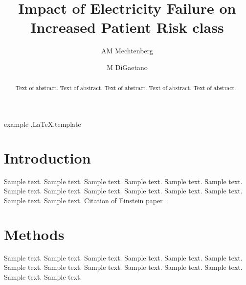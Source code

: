 \documentclass[preprint,12pt,3p]{elsarticle}
\begin{document}
\begin{frontmatter}

\title{Impact of Electricity Failure on Increased Patient Risk   class}


\author[label1,label2]{AM Mechtenberg}
\address[label1]{University of Notre Dame, Physics}



\author[label5]{M DiGaetano}
\address[label5]{Some University}

\begin{abstract}
Text of abstract. Text of abstract. Text of abstract. Text of abstract. Text of abstract. 
\end{abstract}

\begin{keyword}
example \sep \LaTeX \sep template
\end{keyword}

\end{frontmatter}


\section{Introduction}
\label{sec1}

Sample text. Sample text. Sample text. Sample text. Sample text. Sample text. 
Sample text. Sample text. Sample text. Sample text. Sample text. Sample text. 
Sample text. Sample text. Citation of Einstein paper~\cite{Einstein}.

\section{Methods}
\label{sec1}

Sample text. Sample text. Sample text. Sample text. Sample text. Sample text. 
Sample text. Sample text. Sample text. Sample text. Sample text. Sample text. 
Sample text. Sample text.
\end{document}

